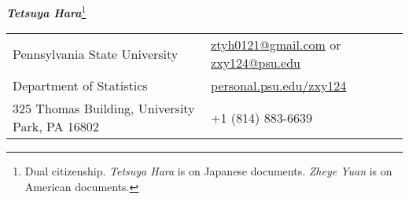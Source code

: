 \documentclass[utf8,letterpaper,oneside]{article}
\begin{document}
\noindent  \textit{\large\textbf{Tetsuya Hara}}\footnote[1]{\noindent Dual citizenship. \textit{Tetsuya Hara} is on Japanese documents. \textit{Zheye Yuan} is on American documents.}
\small
\begin{center}
 \begin{tabular}{l l}
  Pennsylvania State University                  & \hspace{1in} \href{mailto:ztyh0121@gmail.com}{ztyh0121@gmail.com} or \href{mailto:zxy124@psu.edu}{zxy124@psu.edu} \\
  Department of Statistics                       & \hspace{1in}   \href{http://personal.psu.edu/zxy124/}{personal.psu.edu/zxy124}                                    \\
  325 Thomas Building, University Park, PA 16802 & \hspace{1in}+1 (814) 883-6639                                                                                     \\
 \end{tabular}
\end{center}
\noindent
\end{document}
